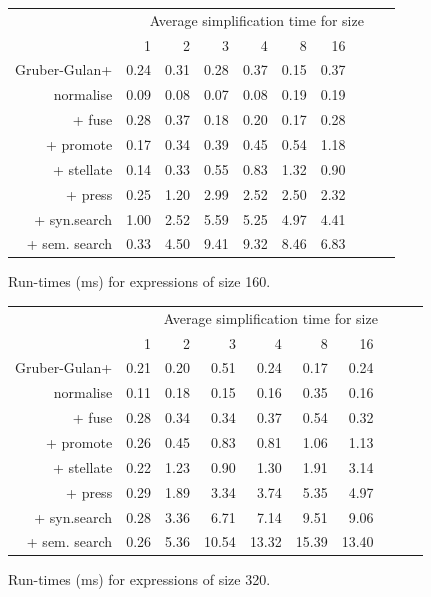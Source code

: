 \begin{figure}\begin{tabular}{rrrrrrrrrr}
 & \multicolumn{9}{c}{Average simplification time for size} \\
 & 1 & 2 & 3 & 4 & 8 & 16 \\
Gruber-Gulan+ & 0.24 & 0.31 & 0.28 & 0.37 & 0.15 & 0.37 \\
normalise & 0.09 & 0.08 & 0.07 & 0.08 & 0.19 & 0.19 \\
+ fuse & 0.28 & 0.37 & 0.18 & 0.20 & 0.17 & 0.28 \\
+ promote & 0.17 & 0.34 & 0.39 & 0.45 & 0.54 & 1.18 \\
+ stellate & 0.14 & 0.33 & 0.55 & 0.83 & 1.32 & 0.90 \\
+ press & 0.25 & 1.20 & 2.99 & 2.52 & 2.50 & 2.32 \\
+ syn.search & 1.00 & 2.52 & 5.59 & 5.25 & 4.97 & 4.41 \\
+ sem. search & 0.33 & 4.50 & 9.41 & 9.32 & 8.46 & 6.83 \\
\end{tabular}\caption{Run-times (ms) for expressions of size 160.}\end{figure}
\begin{figure}\begin{tabular}{rrrrrrrrrr}
 & \multicolumn{9}{c}{Average simplification time for size} \\
 & 1 & 2 & 3 & 4 & 8 & 16 \\
Gruber-Gulan+ & 0.21 & 0.20 & 0.51 & 0.24 & 0.17 & 0.24 \\
normalise & 0.11 & 0.18 & 0.15 & 0.16 & 0.35 & 0.16 \\
+ fuse & 0.28 & 0.34 & 0.34 & 0.37 & 0.54 & 0.32 \\
+ promote & 0.26 & 0.45 & 0.83 & 0.81 & 1.06 & 1.13 \\
+ stellate & 0.22 & 1.23 & 0.90 & 1.30 & 1.91 & 3.14 \\
+ press & 0.29 & 1.89 & 3.34 & 3.74 & 5.35 & 4.97 \\
+ syn.search & 0.28 & 3.36 & 6.71 & 7.14 & 9.51 & 9.06 \\
+ sem. search & 0.26 & 5.36 & 10.54 & 13.32 & 15.39 & 13.40 \\
\end{tabular}\caption{Run-times (ms) for expressions of size 320.}\end{figure}
